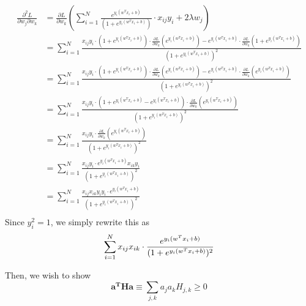 \documentclass{article}
\begin{document}
\begin{align*}
\frac{\partial^{2}L}{\partial w_{j}\partial w_{k}} &=  \frac{\partial L}{\partial w_{k}}(\sum_{i=1}^{N}\frac{e^{y_{i}(w^{T}x_{i}+b)}}{(1+e^{y_{i}(w^{T}x_{i}+b)})}\cdot x_{ij}y_{i}+2\lambda w_{j})\\
&= \sum_{i=1}^{N}\frac{x_{ij}y_{i}\cdot(1+e^{y_{i}(w^{T}x_{i}+b)})\cdot\frac{\partial L}{\partial w_{k}}(e^{y_{i}(w^{T}x_{i}+b)})-e^{y_{i}(w^{T}x_{i}+b)}\cdot\frac{\partial L}{\partial w_{k}}(1+e^{y_{i}(w^{T}x_{i}+b)})}{(1+e^{y_{i}(w^{T}x_{i}+b)})^{2}}\\
&= \sum_{i=1}^{N}\frac{x_{ij}y_{i}\cdot(1+e^{y_{i}(w^{T}x_{i}+b)})\cdot\frac{\partial L}{\partial w_{k}}(e^{y_{i}(w^{T}x_{i}+b)})-e^{y_{i}(w^{T}x_{i}+b)}\cdot\frac{\partial L}{\partial w_{k}}(e^{y_{i}(w^{T}x_{i}+b)})}{(1+e^{y_{i}(w^{T}x_{i}+b)})^{2}}\\
&= \sum_{i=1}^{N}\frac{x_{ij}y_{i}\cdot(1+e^{y_{i}(w^{T}x_{i}+b)}-e^{y_{i}(w^{T}x_{i}+b)})\cdot\frac{\partial L}{\partial w_{k}}(e^{y_{i}(w^{T}x_{i}+b)})}{(1+e^{y_{i}(w^{T}x_{i}+b)})^{2}}\\
&= \sum_{i=1}^{N}\frac{x_{ij}y_{i}\cdot \frac{\partial L}{\partial w_{k}}(e^{y_{i}(w^{T}x_{i}+b)})}{(1+e^{y_{i}(w^{T}x_{i}+b)})^{2}}\\
&= \sum_{i=1}^{N}\frac{x_{ij}y_{i}\cdot e^{y_{i}(w^{T}x_{i}+b)}x_{ik}y_{i}}{(1+e^{y_{i}(w^{T}x_{i}+b)})^{2}}\\
&= \sum_{i=1}^{N}\frac{x_{ij}x_{ik}y_{i}y_{i}\cdot e^{y_{i}(w^{T}x_{i}+b)}}{(1+e^{y_{i}(w^{T}x_{i}+b)})^{2}}\\
\end{align*}
Since \(y_i^2 = 1\), we simply rewrite this as
\begin{equation}
  \sum_{i=1}^{N}x_{ij}x_{ik}\cdot \frac{e^{y_{i}(w^{T}x_{i}+b)}}{(1+e^{y_{i}(w^{T}x_{i}+b)})^{2}}\\
\end{equation}

Then, we wish to show
\begin{equation*}
  \mathbf{a^THa} \equiv \sum_{j,k}a_ja_kH_{j,k} \geq 0
\end{equation*}
\end{document}
